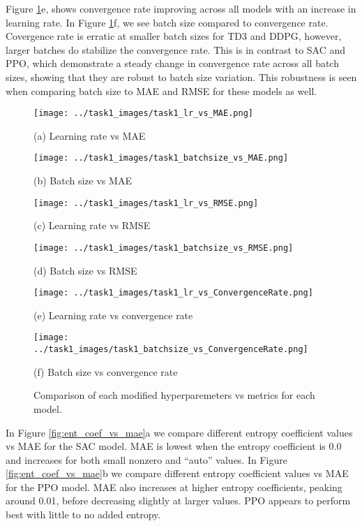 \documentclass[11pt]{article}
\begin{document}
Figure \ref{fig:hypvsmetrics}e, shows convergence rate improving across all models with an increase in learning rate. In Figure \ref{fig:hypvsmetrics}f, we see batch size compared to convergence rate. Covergence rate is erratic at smaller batch sizes for TD3 and DDPG, however, larger batches do stabilize the convergence rate. This is in contrast to SAC and PPO, which demonstrate a steady change in convergence rate across all batch sizes, showing that they are robust to batch size variation. This robustness is seen when comparing batch size to MAE and RMSE for these models as well.



\begin{figure}[h!]
  \centering
  \begin{minipage}[b]{0.49\textwidth}
    \texttt{[image: ../task1\_images/task1\_lr\_vs\_MAE.png]}
    \caption*{(a) Learning rate vs MAE}
  \end{minipage}
  \hfill
  \begin{minipage}[b]{0.49\textwidth}
    \texttt{[image: ../task1\_images/task1\_batchsize\_vs\_MAE.png]}
    \caption*{(b) Batch size vs MAE}
  \end{minipage}
  \begin{minipage}[b]{0.49\textwidth}
    \texttt{[image: ../task1\_images/task1\_lr\_vs\_RMSE.png]}
    \caption*{(c) Learning rate vs RMSE}
  \end{minipage}
  \hfill
  \begin{minipage}[b]{0.49\textwidth}
    \texttt{[image: ../task1\_images/task1\_batchsize\_vs\_RMSE.png]}
    \caption*{(d) Batch size vs RMSE}
  \end{minipage}
  \begin{minipage}[b]{0.49\textwidth}
    \texttt{[image: ../task1\_images/task1\_lr\_vs\_ConvergenceRate.png]}
    \caption*{(e) Learning rate vs convergence rate}
  \end{minipage}
  \hfill
  \begin{minipage}[b]{0.49\textwidth}
    \texttt{[image: ../task1\_images/task1\_batchsize\_vs\_ConvergenceRate.png]}
    \caption*{(f) Batch size vs convergence rate}
  \end{minipage}
  \caption{Comparison of each modified hyperparemeters vs metrics for each model.}
  \label{fig:hypvsmetrics}
\end{figure}


In Figure \ref{fig:ent_coef_vs_mae}a we compare different entropy coefficient values vs MAE for the SAC model. MAE is lowest when the entropy coefficient is 0.0 and increases for both small nonzero and “auto” values. In Figure \ref{fig:ent_coef_vs_mae}b we compare different entropy coefficient values vs MAE for the PPO model. MAE also increases at higher entropy coefficients, peaking around 0.01, before decreasing slightly at larger values. PPO appears to perform best with little to no added entropy.
\end{document}
